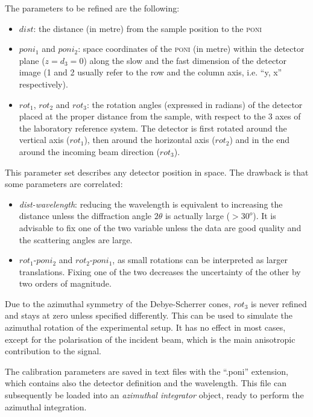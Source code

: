 \documentclass[preprint, pdf]{iucr}              %
\begin{document}
The parameters to be refined are the following:
\begin{itemize}
  \item $dist$: the distance (in metre) from the sample position to the
  \textsc{poni}
  \item $poni_1$ and $poni_2$: space coordinates of the
  \textsc{poni} (in metre) within the detector plane ($z=d_3=0$) along the slow
  and the fast dimension of the detector image (1 and 2 usually refer to the row
  and the column axis, i.e. ``y, x'' respectively).
  \item $rot_1$, $rot_2$ and $rot_3$: the
  rotation angles (expressed in radians) of the detector placed at the proper
  distance from the sample, with respect to the 3 axes of the
  laboratory reference system.
  The detector is first rotated around the vertical axis ($rot_1$), then
  around the horizontal axis ($rot_2$) and in the end around the
  incoming beam direction ($rot_3$).
\end{itemize}

This parameter set describes any detector position in
space.
The drawback is that some parameters are correlated: 
\begin{itemize}
  \item \textit{dist-wavelength}: reducing the wavelength is equivalent to
  increasing the distance unless the diffraction angle $2\theta$ is actually
  large ($>30^o$). 
  It is advisable to fix one of the two variable unless the data are good
  quality and the scattering angles are large.
  \item $rot_1$-$poni_2$ and $rot_2$-$poni_1$, as small rotations can be
  interpreted as larger translations. 
  Fixing one of the two decreases the uncertainty of the other by two orders of
  magnitude.
\end{itemize}

Due to the azimuthal symmetry of the Debye-Scherrer cones, $rot_3$ 
is never refined and stays at zero unless specified differently.  
This can be used to simulate the azimuthal rotation of the
experimental setup. 
It has no effect in most cases, except for the
polarisation of the incident beam, which is the
main anisotropic contribution to the signal.

The calibration parameters are saved in text files with the ``.poni''
extension, which contains also the detector definition and the wavelength.
This file can subsequently be loaded into an \textit{azimuthal integrator}
object, ready to perform the azimuthal integration.
\end{document}
